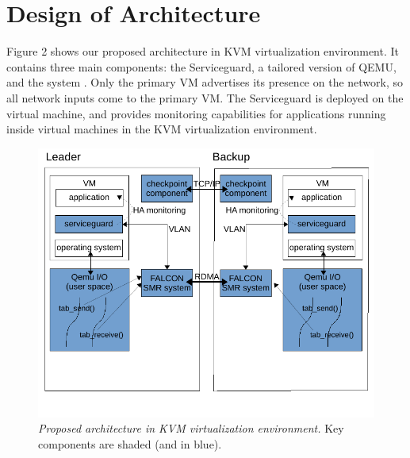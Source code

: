 \section{Design of Architecture} \label{sec:overview}

Figure 2 shows our proposed architecture in KVM virtualization environment. 
It contains three main components: the Serviceguard, a tailored version 
of QEMU, and the \smr system \smrsystem. 
Only the primary VM advertises its presence on the network, so all network 
inputs come to the primary VM. 
The Serviceguard is deployed on the virtual machine, and provides monitoring 
capabilities for applications running inside virtual machines in the KVM 
virtualization environment.

\begin{figure}[t]
\centering
\includegraphics[width=.47\textwidth]{figures/arch}
\vspace{-.2in}
\caption{{\em Proposed architecture in KVM virtualization environment.} Key 
components are shaded (and in blue).} \label{fig:arc}
\vspace{.05in}
\end{figure}

